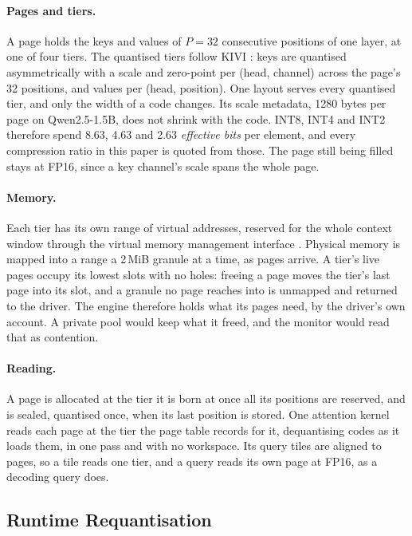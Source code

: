 \documentclass[11pt]{article}
\begin{document}
\paragraph{Pages and tiers.} A page holds the keys and values of $P = 32$
consecutive positions of one layer, at one of four tiers. The quantised tiers
follow KIVI \cite{liu2024kivi}: keys are quantised asymmetrically with a scale
and zero-point per (head, channel) across the page's 32 positions, and values
per (head, position). One layout serves every quantised tier, and only the
width of a code changes. Its scale metadata, 1280 bytes per page on
Qwen2.5-1.5B, does not shrink with the code. INT8, INT4 and INT2 therefore
spend 8.63, 4.63 and 2.63 \textit{effective bits} per element, and every
compression ratio in this paper is quoted from those. The page still being
filled stays at FP16, since a key channel's scale spans the whole page.

\paragraph{Memory.} Each tier has its own range of virtual addresses, reserved
for the whole context window through the virtual memory management interface
\cite{cudavmm}. Physical memory is mapped into a range a 2\,MiB granule at a
time, as pages arrive. A tier's live pages occupy its lowest slots with no holes:
freeing a page moves the tier's last page into its slot, and a granule no page
reaches into is unmapped and returned to the driver. The engine therefore holds
what its pages need, by the driver's own account. A private pool would
keep what it freed, and the monitor would read that as contention.

\paragraph{Reading.} A page is allocated at the tier it is born at once all its
positions are reserved, and is sealed, quantised once, when its last position is
stored. One attention kernel reads each page at the tier the page table records
for it, dequantising codes as it loads them, in one pass and with no workspace.
Its query tiles are aligned to pages, so a tile reads one tier, and a query reads
its own page at FP16, as a decoding query does.

\subsection{Runtime Requantisation}
\label{sec:requantisation}
\end{document}

